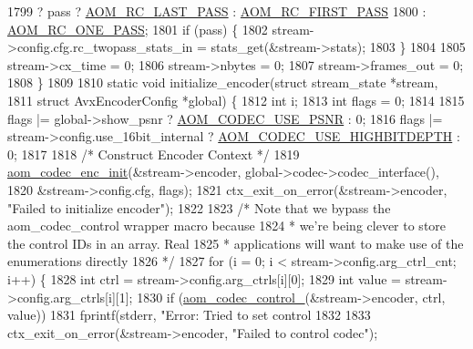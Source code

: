 \begin{DoxyCodeInclude}
{{{{{{{{{{{{{{{{{{{{{{{{{{{{{{{1799                                   ? pass ? \hyperlink{group__encoder_gga92b6709b58dc3435e3ba652da562eda1a621c3f07937527618dc06e962425f6cc}{AOM\_RC\_LAST\_PASS} : 
      \hyperlink{group__encoder_gga92b6709b58dc3435e3ba652da562eda1ad342b33a290482c20238bfde5d9bea1e}{AOM\_RC\_FIRST\_PASS}
1800                                   : \hyperlink{group__encoder_gga92b6709b58dc3435e3ba652da562eda1a1b4b8ee9c1910fc59ac9dfd9700f3f02}{AOM\_RC\_ONE\_PASS};
1801   \textcolor{keywordflow}{if} (pass) \{
1802     stream->config.cfg.rc\_twopass\_stats\_in = stats\_get(&stream->stats);
1803   \}
1804 
1805   stream->cx\_time = 0;
1806   stream->nbytes = 0;
1807   stream->frames\_out = 0;
1808 \}
1809 
1810 \textcolor{keyword}{static} \textcolor{keywordtype}{void} initialize\_encoder(\textcolor{keyword}{struct} stream\_state *stream,
1811                                \textcolor{keyword}{struct} AvxEncoderConfig *global) \{
1812   \textcolor{keywordtype}{int} i;
1813   \textcolor{keywordtype}{int} flags = 0;
1814 
1815   flags |= global->show\_psnr ? \hyperlink{group__encoder_gae722c9f9ba9b4ca8dba6bbe7c0692024}{AOM\_CODEC\_USE\_PSNR} : 0;
1816   flags |= stream->config.use\_16bit\_internal ? \hyperlink{group__encoder_gae30bbbdef18e9da3631b69c170533e92}{AOM\_CODEC\_USE\_HIGHBITDEPTH} : 0;
1817 
1818   \textcolor{comment}{/* Construct Encoder Context */}
1819   \hyperlink{group__encoder_gaade68a7d33d30f97dc9a596aa5e065d8}{aom\_codec\_enc\_init}(&stream->encoder, global->codec->codec\_interface(),
1820                      &stream->config.cfg, flags);
1821   ctx\_exit\_on\_error(&stream->encoder, \textcolor{stringliteral}{"Failed to initialize encoder"});
1822 
1823   \textcolor{comment}{/* Note that we bypass the aom\_codec\_control wrapper macro because}
1824 \textcolor{comment}{   * we're being clever to store the control IDs in an array. Real}
1825 \textcolor{comment}{   * applications will want to make use of the enumerations directly}
1826 \textcolor{comment}{   */}
1827   \textcolor{keywordflow}{for} (i = 0; i < stream->config.arg\_ctrl\_cnt; i++) \{
1828     \textcolor{keywordtype}{int} ctrl = stream->config.arg\_ctrls[i][0];
1829     \textcolor{keywordtype}{int} value = stream->config.arg\_ctrls[i][1];
1830     \textcolor{keywordflow}{if} (\hyperlink{group__codec_ga51eb332a40dcacc39000ab8e0be36b79}{aom\_codec\_control\_}(&stream->encoder, ctrl, value))
1831       fprintf(stderr, \textcolor{stringliteral}{"Error: Tried to set control %
1832 
1833     ctx\_exit\_on\_error(&stream->encoder, \textcolor{stringliteral}{"Failed to control codec"});
}}}}}}}}}}}}}}}}}}}}}}}}}}}}}}}}
\end{DoxyCodeInclude}
